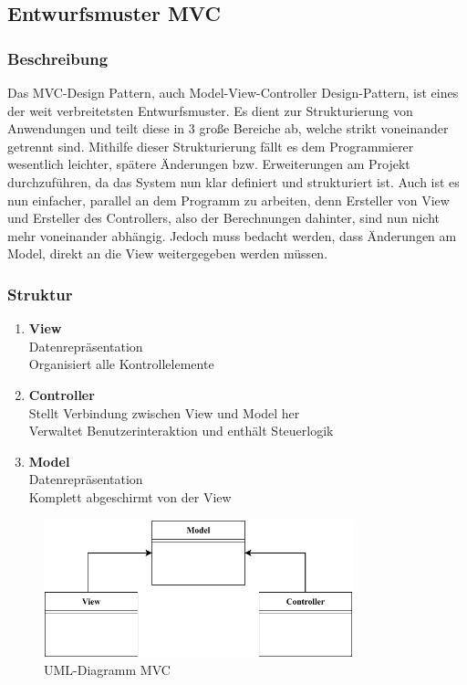 \subsection{Entwurfsmuster MVC}\label{subsec:entwurfsmuster-mvc}
\subsubsection{Beschreibung}
Das MVC-Design Pattern, auch Model-View-Controller Design-Pattern, ist eines der weit verbreitetsten Entwurfsmuster.
Es dient zur Strukturierung von Anwendungen und teilt diese in 3 große Bereiche ab, welche strikt voneinander getrennt sind.
Mithilfe dieser Strukturierung fällt es dem Programmierer wesentlich leichter, spätere Änderungen bzw. Erweiterungen am Projekt durchzuführen, da das System nun klar definiert und strukturiert ist.
Auch ist es nun einfacher, parallel an dem Programm zu arbeiten, denn Ersteller von View und Ersteller des Controllers, also der Berechnungen dahinter, sind nun nicht mehr voneinander abhängig.
Jedoch muss bedacht werden, dass Änderungen am Model, direkt an die View weitergegeben werden müssen.
\subsubsection{Struktur}
\begin{enumerate}
    \item \textbf{View}  \\
    Datenrepräsentation\\
    Organisiert alle Kontrollelemente
    \item \textbf{Controller} \\
    Stellt Verbindung zwischen View und Model her\\
    Verwaltet Benutzerinteraktion und enthält Steuerlogik
    \item \textbf{Model} \\
    Datenrepräsentation\\
    Komplett abgeschirmt von der View
\end{enumerate}
\begin{figure}[H]
    \centering
    \includegraphics[width=0.8\textwidth]{fig/ainf/ModelViewController.pdf}
    \caption{UML-Diagramm MVC}
    \label{fig:UML-Diagramm MVC}
\end{figure}
